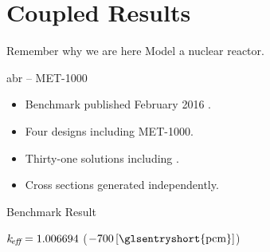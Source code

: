 \section{Coupled Results}
\label{sec:coupledResults}

\begin{frame}{Remember why we are here}
  \pause
  \huge Model a nuclear reactor.
\end{frame}

\begin{frame}{\gls{abr} -- MET-1000}
  \begin{itemize}
    \item Benchmark published February 2016 \cite{abr}.
    \item Four designs including MET-1000.
    \item Thirty-one solutions including \dif.
    \item Cross sections generated independently.
  \end{itemize}
\end{frame}

\begin{frame}{Benchmark Result}
  \vspace{-0.25in}
  \begin{figure}
    \centering
    \hspace{1in}
  \end{figure}
  \begin{block}{}
    \centering
    $k_{\!\mbox{\scriptsize \em eff}} =  1.006694 $ \qquad (\dif $-700\units{\glsentryshort{pcm}}$)
  \end{block}
\end{frame}

